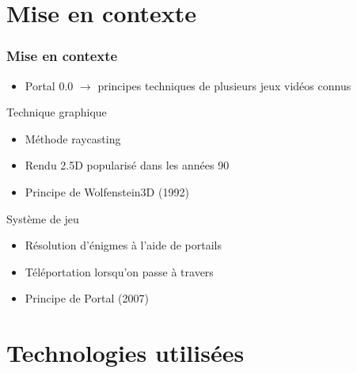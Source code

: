 \documentclass{beamer}
\begin{document}
\section{Mise en contexte}

\begin{frame}
    \frametitle{Mise en contexte}
    \begin{block}{}
        \begin{itemize}
            \item Portal 0.0 $\rightarrow $ principes techniques de plusieurs jeux vidéos connus
        \end{itemize}
    \end{block}

    \begin{block}{Technique graphique}
        \begin{itemize}
            \item Méthode raycasting
            \item Rendu 2.5D popularisé dans les années 90
            \item Principe de Wolfenstein3D (1992)
        \end{itemize}
    \end{block}

    \begin{block}{Système de jeu}
        \begin{itemize}
            \item Résolution d'énigmes à l'aide de portails
            \item Téléportation lorsqu'on passe à travers
            \item Principe de Portal (2007)
        \end{itemize}
    \end{block}
\end{frame}

\section{Technologies utilisées}
\end{document}
